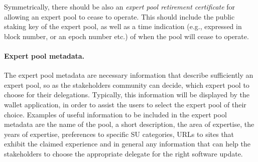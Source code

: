Symmetrically, there should be also an \emph{expert pool retirement certificate}
for allowing an expert pool to cease to operate. This should include the public
staking key of the expert pool, as well as a time indication (e.g., expressed in
block number, or an epoch number etc.) of when the pool will cease to operate.

\paragraph{Expert pool metadata.}
The expert pool metadata are necessary information that describe sufficiently an
expert pool, so as the stakeholders community can decide, which expert pool to
choose for their delegations. Typically, this information will be displayed by
the wallet application, in order to assist the users to select the expert pool
of their choice. Examples of useful information to be included in the expert
pool metadata are the name of the pool, a short description, the area of
expertise, the years of expertise, preferences to specific SU categories, URLs
to sites that exhibit the claimed experience and in general any information that
can help the stakeholders to choose the appropriate delegate for the right
software update.


